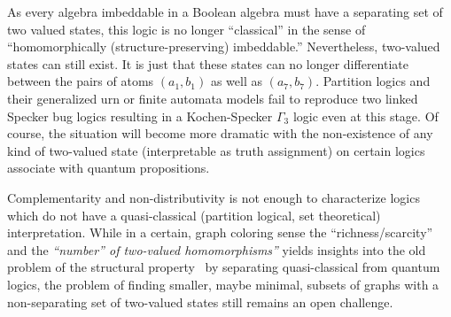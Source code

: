 \documentclass[%
  twocolumn,
 showpacs,
 showkeys,
 preprintnumbers,
 amsmath,amssymb,
 aps,
  pra,
  longbibliography,
 floatfix,
 ]{revtex4-1}
\begin{document}
As every algebra imbeddable in a Boolean algebra must have a separating set of two valued states,
this logic is no longer ``classical''
in the sense of ``homomorphically (structure-preserving) imbeddable.''
Nevertheless, two-valued states can still exist. It is just that these states can no longer differentiate
between the pairs of atoms $(a_1,b_1)$ as well as $(a_7,b_7)$.
Partition logics and their generalized urn or finite automata models fail to reproduce
two linked Specker bug logics resulting in a Kochen-Specker $\Gamma_3$ logic even at this stage.
Of course, the situation will become more dramatic with the non-existence of any kind of two-valued state
(interpretable as truth assignment) on certain logics associate with quantum propositions.

Complementarity and non-distributivity is not enough to characterize logics which do not have a quasi-classical
(partition logical, set theoretical) interpretation.
While in a certain, graph coloring sense the ``richness/scarcity'' and the {\em ``number''
of two-valued homomorphisms''} yields insights into the old problem of the structural property~\cite{Cooke-1983}
by
separating quasi-classical from quantum logics,
the problem of finding smaller, maybe minimal,
subsets of graphs with a non-separating set of two-valued states  still remains an open challenge.
\end{document}
